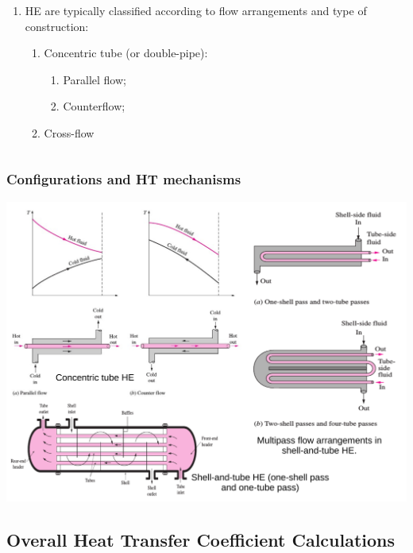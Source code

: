 \documentclass[10pt,compress,unknownkeysallowed]{beamer}
\begin{document}
\begin{frame}
\begin{columns}
\begin{column}[l]{0.5\linewidth}
\begin{enumerate}
            \item<3-> HE are typically classified according to flow arrangements and type of construction:
              \begin{enumerate}\scriptsize
                  \item<3-> Concentric tube (or double-pipe):
                       \begin{enumerate}\scriptsize
                          \item<3-> Parallel flow;
                          \item<3-> Counterflow;
                       \end{enumerate}
                  \item<3-> Cross-flow
              \end{enumerate}
         \end{enumerate}
       \end{column}      
    \end{columns}
\end{frame}


\begin{frame}
  \frametitle{Configurations and HT mechanisms}
    \begin{center}
         \includegraphics[width=1.\columnwidth,height=0.65\columnwidth,clip]{./Pics/HeatExchangers_Classification2}
    \end{center}
\end{frame}




\subsection{Overall Heat Transfer Coefficient Calculations}
\end{document}
